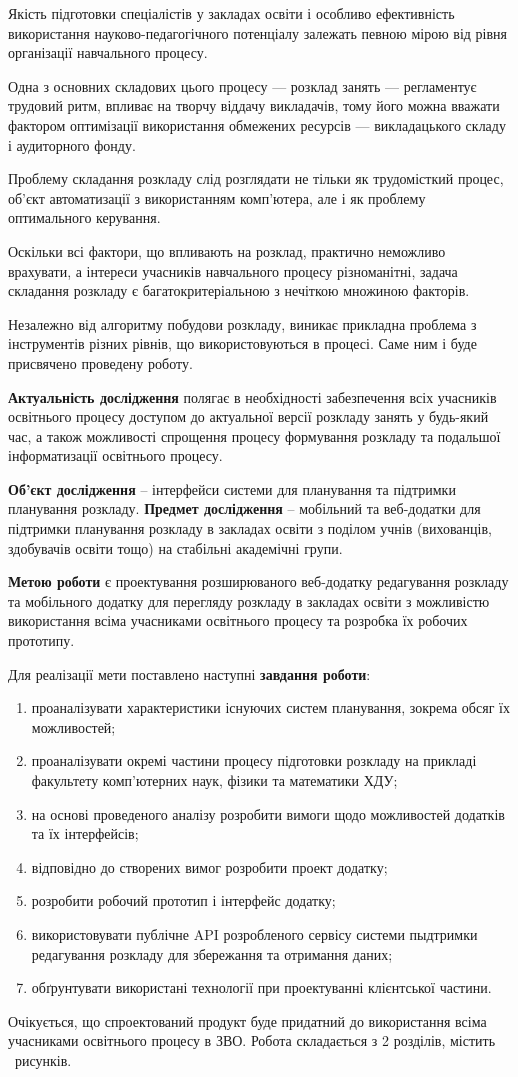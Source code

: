 
Якість підготовки спеціалістів у закладах освіти і особливо ефективність використання науково-педагогічного потенціалу залежать певною мірою від рівня організації навчального процесу.

Одна з основних складових цього процесу — розклад занять — регламентує трудовий ритм, впливає на творчу віддачу викладачів, тому його можна вважати фактором оптимізації використання обмежених ресурсів — викладацького складу і аудиторного фонду.

Проблему складання розкладу слід розглядати не тільки як трудомісткий процес, об'єкт автоматизації з використанням комп’ютера, але і як проблему оптимального керування. 

Оскільки всі фактори, що впливають на розклад, практично неможливо врахувати, а інтереси учасників навчального процесу різноманітні, задача складання розкладу є багатокритеріальною з нечіткою множиною факторів.

Незалежно від алгоритму побудови розкладу, виникає прикладна проблема з інструментів різних рівнів, що використовуються в процесі. Саме ним і буде присвячено проведену роботу.

\textbf{Актуальність дослідження} полягає в необхідності забезпечення всіх учасників освітнього процесу доступом до актуальної версії розкладу занять у будь-який час, а також можливості спрощення процесу формування розкладу та подальшої інформатизації освітнього процесу.

\textbf{Об'єкт дослідження} -- інтерфейси системи для планування та підтримки планування розкладу. \textbf{Предмет дослідження} -- мобільний та веб-додатки для підтримки планування розкладу в закладах освіти з поділом учнів (вихованців, здобувачів освіти тощо) на стабільні академічні групи.

\textbf{Метою роботи} є проектування розширюваного веб-додатку редагування розкладу та мобільного додатку для перегляду розкладу в закладах освіти з можливістю використання всіма учасниками освітнього процесу та розробка їх робочих прототипу.

Для реалізації мети поставлено наступні \textbf{завдання роботи}:
\begin{enumerate}
	\item проаналізувати характеристики існуючих систем планування, зокрема обсяг їх можливостей;
	\item проаналізувати окремі частини процесу підготовки розкладу на прикладі факультету комп’ютерних наук, фізики та математики ХДУ;
	\item на основі проведеного аналізу розробити вимоги щодо можливостей додатків та їх інтерфейсів;
	\item відповідно до створених вимог розробити проект додатку;
	\item розробити робочий прототип і інтерфейс додатку;
	\item використовувати публічне API розробленого сервісу системи пыдтримки редагування розкладу для збережання та отримання даних;
	\item обґрунтувати використані технології при проектуванні клієнтської частини.
\end{enumerate}

Очікується, що спроектований продукт буде придатний до використання всіма учасниками освітнього процесу в ЗВО.
Робота складається з 2 розділів, містить \totalfigures\ рисунків.
